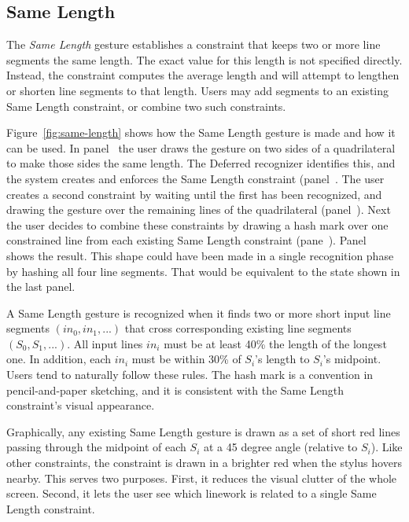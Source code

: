 \subsection{Same Length}

The \textit{Same Length} gesture establishes a constraint that keeps
two or more line segments the same length. The exact value for this
length is not specified directly. Instead, the constraint computes the
average length and will attempt to lengthen or shorten line segments
to that length. Users may add segments to an existing Same Length
constraint, or combine two such constraints. 



Figure~\ref{fig:same-length} shows how the Same Length gesture is made
and how it can be used. In panel~\textit{}
the user draws the gesture on two sides of a quadrilateral to make
those sides the same length. The Deferred recognizer identifies this,
and the system creates and enforces the Same Length constraint
(panel~\textit{}. The user creates a second
constraint by waiting until the first has been recognized, and drawing
the gesture over the remaining lines of the quadrilateral
(panel~\textit{}). Next the user decides to
combine these constraints by drawing a hash mark over one constrained
line from each existing Same Length constraint
(pane~\textit{}). Panel~\textit{}
shows the result. This shape could have been made in a single
recognition phase by hashing all four line segments. That would be
equivalent to the state shown in the last panel.

A Same Length gesture is recognized when it finds two or more short
input line segments $(in_0, in_1, ...)$ that cross corresponding
existing line segments $(S_0, S_1, ...)$. All input lines $in_i$ must
be at least 40\% the length of the longest one. In addition, each
$in_i$ must be within 30\% of $S_i$'s length to $S_i$'s
midpoint. Users tend to naturally follow these rules. The hash mark is
a convention in pencil-and-paper sketching, and it is consistent with
the Same Length constraint's visual appearance.

Graphically, any existing Same Length gesture is drawn as a set of
short red lines passing through the midpoint of each $S_i$ at a 45
degree angle (relative to $S_i$). Like other constraints, the
constraint is drawn in a brighter red when the stylus hovers
nearby. This serves two purposes. First, it reduces the visual clutter
of the whole screen. Second, it lets the user see which linework is
related to a single Same Length constraint. 

